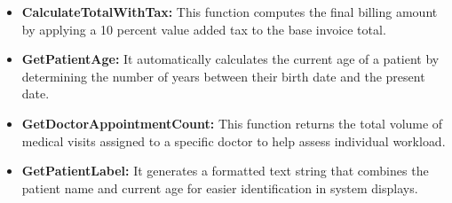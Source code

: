 \begin{itemize}
    \item \textbf{CalculateTotalWithTax:} This function computes the final billing amount by applying a 10 percent value added tax to the base invoice total.
    \item \textbf{GetPatientAge:} It automatically calculates the current age of a patient by determining the number of years between their birth date and the present date.
    \item \textbf{GetDoctorAppointmentCount:} This function returns the total volume of medical visits assigned to a specific doctor to help assess individual workload.
    \item \textbf{GetPatientLabel:} It generates a formatted text string that combines the patient name and current age for easier identification in system displays.
\end{itemize}